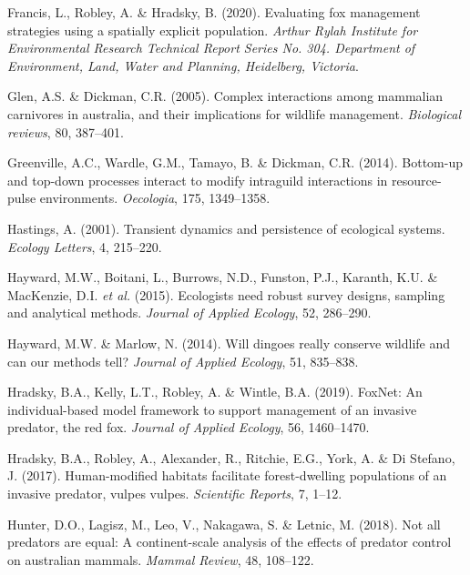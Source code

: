 \documentclass[]{elsarticle} %
\begin{document}
\leavevmode\hypertarget{ref-francis2020evaluating}{}%
Francis, L., Robley, A. \& Hradsky, B. (2020). Evaluating fox management strategies using a spatially explicit population. \emph{Arthur Rylah Institute for Environmental Research Technical Report Series No. 304. Department of Environment, Land, Water and Planning, Heidelberg, Victoria}.

\leavevmode\hypertarget{ref-glen2005}{}%
Glen, A.S. \& Dickman, C.R. (2005). Complex interactions among mammalian carnivores in australia, and their implications for wildlife management. \emph{Biological reviews}, 80, 387--401.

\leavevmode\hypertarget{ref-greenville2014bottom}{}%
Greenville, A.C., Wardle, G.M., Tamayo, B. \& Dickman, C.R. (2014). Bottom-up and top-down processes interact to modify intraguild interactions in resource-pulse environments. \emph{Oecologia}, 175, 1349--1358.

\leavevmode\hypertarget{ref-hastings2001}{}%
Hastings, A. (2001). Transient dynamics and persistence of ecological systems. \emph{Ecology Letters}, 4, 215--220.

\leavevmode\hypertarget{ref-hayward2015}{}%
Hayward, M.W., Boitani, L., Burrows, N.D., Funston, P.J., Karanth, K.U. \& MacKenzie, D.I. \emph{et al.} (2015). Ecologists need robust survey designs, sampling and analytical methods. \emph{Journal of Applied Ecology}, 52, 286--290.

\leavevmode\hypertarget{ref-https:ux2fux2fdoi.orgux2f10.1111ux2f1365-2664.12250}{}%
Hayward, M.W. \& Marlow, N. (2014). Will dingoes really conserve wildlife and can our methods tell? \emph{Journal of Applied Ecology}, 51, 835--838.

\leavevmode\hypertarget{ref-hradsky2019foxnet}{}%
Hradsky, B.A., Kelly, L.T., Robley, A. \& Wintle, B.A. (2019). FoxNet: An individual-based model framework to support management of an invasive predator, the red fox. \emph{Journal of Applied Ecology}, 56, 1460--1470.

\leavevmode\hypertarget{ref-hradsky2017human}{}%
Hradsky, B.A., Robley, A., Alexander, R., Ritchie, E.G., York, A. \& Di Stefano, J. (2017). Human-modified habitats facilitate forest-dwelling populations of an invasive predator, vulpes vulpes. \emph{Scientific Reports}, 7, 1--12.

\leavevmode\hypertarget{ref-hunter2018}{}%
Hunter, D.O., Lagisz, M., Leo, V., Nakagawa, S. \& Letnic, M. (2018). Not all predators are equal: A continent-scale analysis of the effects of predator control on australian mammals. \emph{Mammal Review}, 48, 108--122.
\end{document}
